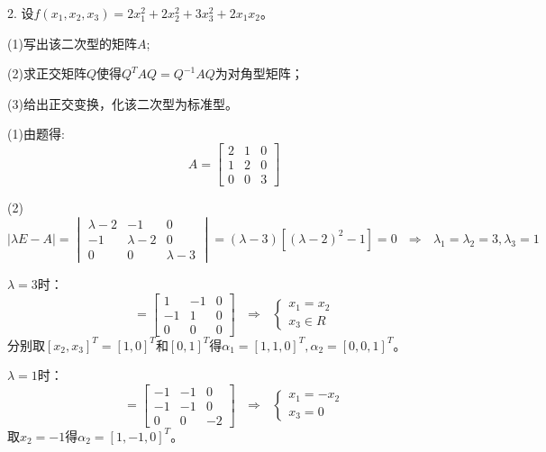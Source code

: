 \documentclass{article}
\begin{document}
2. 设$f(x_ {1},x_{2},x_{3})=2x_{1}^{2}+2x_{2}^{2}+3x_{3}^{2}+2x_{1}x_{2}$。

(1)写出该二次型的矩阵$A$;

(2)求正交矩阵$Q$使得$Q^{T}AQ=Q^{-1}AQ$为对角型矩阵；

(3)给出正交变换，化该二次型为标准型。

\begin{jie}
(1)由题得:
\begin{equation*}
A=
\begin{bmatrix}
  2 & 1 & 0 \\
  1  & 2 & 0\\
  0 & 0 & 3
\end{bmatrix}
\end{equation*}

(2)
\begin{equation*}
|\lambda E-A|=
\begin{vmatrix}
  \lambda-2 & -1 & 0 \\
  -1  & \lambda-2 & 0\\
  0 & 0 & \lambda-3
\end{vmatrix}=(\lambda-3)[(\lambda-2)^2-1]=0~~~\Rightarrow ~~~\lambda_1=\lambda_2=3,\lambda_3=1
\end{equation*}

$\lambda=3$时：
\begin{equation*}
[\lambda E-A]=
\begin{bmatrix}
  1 & -1 & 0 \\
  -1  & 1 & 0\\
  0 & 0 & 0
\end{bmatrix}~~~\Rightarrow~~~
\begin{cases}
 x_1=x_2\\
 x_3\in R
\end{cases}
\end{equation*}
分别取$[x_2,x_3]^T=[1,0]^T$和$[0,1]^T$得$\alpha_1=[1,1,0]^T,\alpha_2=[0,0,1]^T$。

$\lambda=1$时：
\begin{equation*}
[\lambda E-A]=
\begin{bmatrix}
  -1 & -1 & 0 \\
  -1  & -1 & 0\\
  0 & 0 & -2
\end{bmatrix}~~~\Rightarrow~~~
\begin{cases}
 x_1=-x_2\\
 x_3=0
\end{cases}
\end{equation*}
取$x_2=-1$得$\alpha_2=[1,-1,0]^T$。


\end{jie}
\end{document}
